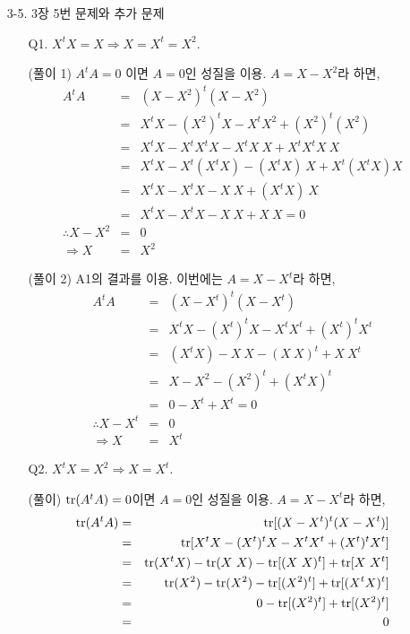 \documentclass[fleqn, a4paper]{article}
\begin{document}

\begin{enumerate}
\item[3-5.] 3장 5번 문제와 추가 문제 
\begin{enumerate}
\item[Q1.] $X^tX = X\Rightarrow X = X^t = X^2$.
\item[(풀이 1)] $A^tA = 0$ 이면 $A = 0$인 성질을 이용. $A=X-X^2$라 하면,
\begin{eqnarray*}
A^tA&=&(X-X^2)^t(X-X^2)\\
      &=&X^tX-(X^2)^tX - X^tX^2 + (X^2)^t(X^2)\\
      &=&X^tX-X^tX^tX-X^tX\ X + X^tX^tX\ X\\
      &=&X^tX-X^t(X^tX)-(X^tX)\ X + X^t(X^tX)X\\
      &=&X^tX-X^tX-X\ X + (X^tX)\ X\\
      &=&X^tX-X^tX-X\ X + X\ X = 0\\
      \therefore X-X^2&=&0\\
      \Rightarrow X&=&X^2 
\end{eqnarray*}
\item[(풀이 2)] A1의 결과를 이용. 이번에는 $A=X-X^t$라 하면,
\begin{eqnarray*}
A^tA &=&(X-X^t)^t(X-X^t)\\ 
      &=&X^tX-(X^t)^tX - X^tX^t + (X^t)^tX^t\\
      &=&(X^tX)-X\ X - (X\ X)^t + X\ X^t\\
      &=&X-X^2-(X^2)^t + (X^tX)^t\\
      &=&0-X^t + X^t = 0\\
      \therefore X-X^t&=&0\\
      \Rightarrow X&=&X^t 
\end{eqnarray*}
\item[Q2.] $X^tX = X^2\Rightarrow X = X^t$.
\item[(풀이)] ${\rm tr}(A^tA)=0$이면 $A=0$인 성질을 이용. $A=X-X^t$라 하면,
\begin{eqnarray*}
{\rm tr}(A^tA)&=&{\rm tr}[(X-X^t)^t(X-X^t)]\\ 
      &=&{\rm tr}[X^tX-(X^t)^tX - X^tX^t + (X^t)^tX^t]\\
      &=&{\rm tr}(X^tX)-{\rm tr}(X\ X) - {\rm tr}[(X\ X)^t] + {\rm tr}[X\ X^t]\\
      &=&{\rm tr}(X^2)-{\rm tr}(X^2)-{\rm tr}[(X^2)^t] + {\rm tr}[(X^tX)^t]\\
      &=&0-{\rm tr}[(X^2)^t] + {\rm tr}[(X^2)^t]\\
      &=&0\\

\end{eqnarray*}
\end{enumerate}
\end{enumerate}
\end{document}
